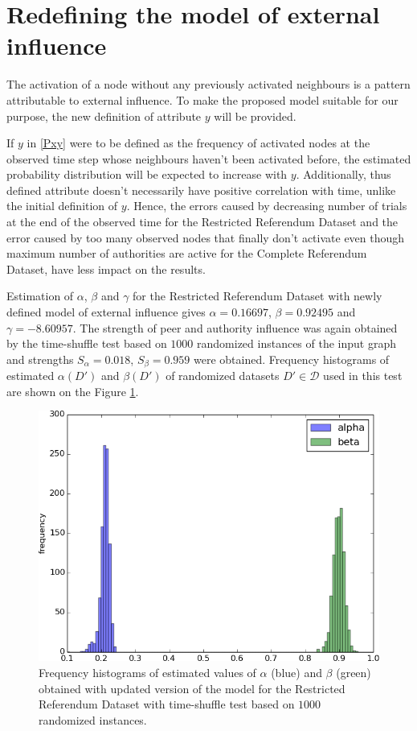 \documentclass[times, utf8, zavrsni]{fer}
\begin{document}
\section{Redefining the model of external influence}

The activation of a node without any previously activated neighbours is a pattern attributable  to external influence. To make the proposed model suitable for our purpose, the new definition of attribute  $y$ will be provided.

If $y$ in \eqref{Pxy} were to be defined as the frequency of activated nodes at the observed time step whose neighbours haven't been activated before, the estimated probability distribution will be  expected to increase with $y$. Additionally, thus defined attribute doesn't necessarily have positive correlation with time, unlike the initial definition of $y$. Hence, the errors caused by decreasing number of trials at the end of the observed time for the Restricted Referendum Dataset and the error caused by too many observed nodes that finally don't activate even though maximum number of authorities are active for the Complete Referendum Dataset, have less impact on the results.

Estimation of $\alpha$, $\beta$ and $\gamma$  for the Restricted Referendum Dataset with newly defined model of external influence gives $\alpha = 0.16697$, $\beta = 0.92495$ and $\gamma = -8.60957$. The strength of peer and authority influence was again obtained by the time-shuffle test based on $1000$ randomized instances of the input graph and strengths $S_{\alpha} = 0.018$, $S_{\beta} = 0.959$ were obtained. Frequency histograms of estimated $\alpha(D')$ and $\beta(D')$ of randomized datasets $D' \in \mathcal{D}$ used in this test are shown on the Figure  \ref{hist_full2}. 
\begin{figure}[htp]
\centering
\includegraphics[scale=0.7]{figs/abg1000_2.png}	
\caption{Frequency histograms of estimated values of $\alpha$ (blue) and $\beta$ (green)  obtained with updated version of the model for the Restricted Referendum Dataset with time-shuffle test based on $1000$ randomized instances.}
\label{hist_full2}
\end{figure}
								
\end{document}
